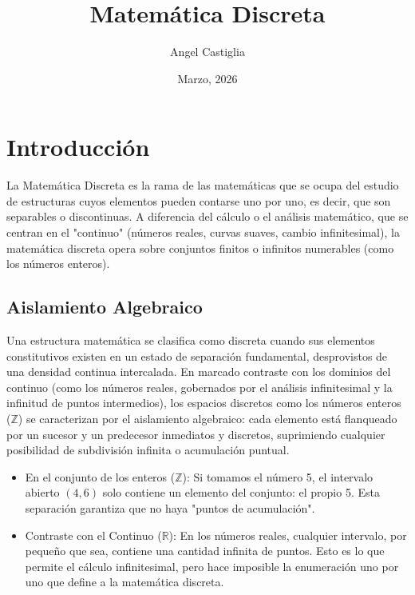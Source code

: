 \documentclass{article}
\title{Matemática Discreta}
\author{Angel Castiglia}
\date{Marzo, 2026}
\begin{document}
\maketitle

\tableofcontents
\newpage

\section{Introducción}
\label{sec:introduccion}

La Matemática Discreta es la rama de las matemáticas que se ocupa del estudio de estructuras cuyos elementos pueden contarse uno por uno, es decir, que son separables o discontinuas. A diferencia del cálculo o el análisis matemático, que se centran en el "continuo" (números reales, curvas suaves, cambio infinitesimal), la matemática discreta opera sobre conjuntos finitos o infinitos numerables (como los números enteros).

\subsection{Aislamiento Algebraico}
\label{sec:aislamiento-algebraico}

Una estructura matemática se clasifica como discreta cuando sus elementos constitutivos existen en un estado de separación fundamental, desprovistos de una densidad continua intercalada. En marcado contraste con los dominios del continuo (como los números reales, gobernados por el análisis infinitesimal y la infinitud de puntos intermedios), los espacios discretos como los números enteros ($\mathbb{Z}$) se caracterizan por el aislamiento algebraico: cada elemento está flanqueado por un sucesor y un predecesor inmediatos y discretos, suprimiendo cualquier posibilidad de subdivisión infinita o acumulación puntual.

\begin{itemize}
\item En el conjunto de los enteros ($\mathbb{Z}$): Si tomamos el número 5, el intervalo abierto $(4, 6)$ solo contiene un elemento del conjunto: el propio 5. Esta separación garantiza que no haya "puntos de acumulación".
\item Contraste con el Continuo ($\mathbb{R}$): En los números reales, cualquier intervalo, por pequeño que sea, contiene una cantidad infinita de puntos. Esto es lo que permite el cálculo infinitesimal, pero hace imposible la enumeración uno por uno que define a la matemática discreta.
\end{itemize}
\end{document}
